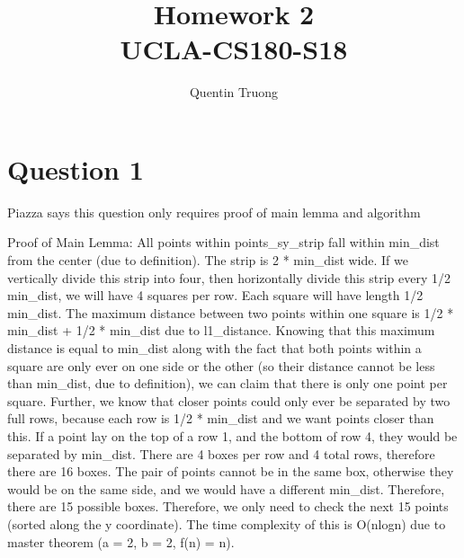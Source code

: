 \documentclass[11pt, oneside]{article}
\title{Homework 2\\UCLA-CS180-S18}
\author{Quentin Truong}
\begin{document}
\maketitle
{}


\section{Question 1}

Piazza says this question only requires proof of main lemma and algorithm \newline

Proof of Main Lemma: \newline
All points within points\_sy\_strip fall within min\_dist from the center (due to definition).
The strip is 2 * min\_dist wide.
If we vertically divide this strip into four, then horizontally divide this strip every 1/2 min\_dist, we will have 4 squares per row.
Each square will have length 1/2 min\_dist.
The maximum distance between two points within one square is 1/2 * min\_dist + 1/2 * min\_dist due to l1\_distance.
Knowing that this maximum distance is equal to min\_dist along with the fact that both points within a square are only ever on one side or the other (so their distance cannot be less than min\_dist, due to definition), 
we can claim that there is only one point per square.
Further, we know that closer points could only ever be separated by two full rows, because each row is 1/2 * min\_dist and we want points closer than this.
If a point lay on the top of a row 1, and the bottom of row 4, they would be separated by min\_dist. 
There are 4 boxes per row and 4 total rows, therefore there are 16 boxes.
The pair of points cannot be in the same box, otherwise they would be on the same side, and we would have a different min\_dist.
Therefore, there are 15 possible boxes.
Therefore, we only need to check the next 15 points (sorted along the y coordinate).
The time complexity of this is O(nlogn) due to master theorem (a = 2, b = 2, f(n) = n).
\end{document}
